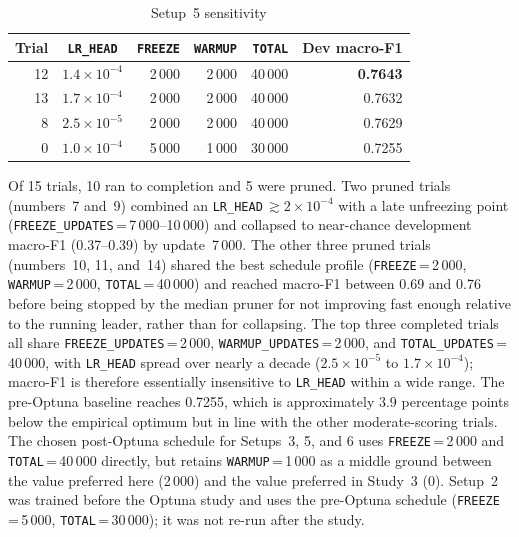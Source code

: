 \begin{table}[H]
\centering
\caption{Setup~5 sensitivity}
\label{tab:app:opt_hubert}
\small
\setlength{\tabcolsep}{5pt}
\begin{tabular}{@{}rcrrrr@{}}
\toprule
\textbf{Trial} & \textbf{\texttt{LR\_HEAD}} & \textbf{\texttt{FREEZE}} & \textbf{\texttt{WARMUP}} & \textbf{\texttt{TOTAL}} & \textbf{Dev macro-F1} \\
\midrule
12      & \(1.4{\times}10^{-4}\) & 2\,000 & 2\,000 & 40\,000 & \textbf{0.7643} \\
13            & \(1.7{\times}10^{-4}\) & 2\,000 & 2\,000 & 40\,000 & 0.7632 \\
 8            & \(2.5{\times}10^{-5}\) & 2\,000 & 2\,000 & 40\,000 & 0.7629 \\
\midrule
 0 & \(1.0{\times}10^{-4}\) & 5\,000 & 1\,000 & 30\,000 & 0.7255 \\
\bottomrule
\end{tabular}
\end{table}

Of 15 trials, 10 ran to completion and 5 were pruned. Two pruned trials
(numbers~7 and~9) combined an \texttt{LR\_HEAD}\,$\gtrsim 2{\times}10^{-4}$
with a late unfreezing point (\texttt{FREEZE\_UPDATES}\,=\,7\,000--10\,000) and
collapsed to near-chance development macro-F1 (0.37--0.39) by update~7\,000.
The other three pruned trials (numbers~10, 11, and~14) shared the best
schedule profile (\texttt{FREEZE}\,=\,2\,000, \texttt{WARMUP}\,=\,2\,000,
\texttt{TOTAL}\,=\,40\,000) and reached macro-F1 between 0.69 and 0.76 before
being stopped by the median pruner for not improving fast enough relative to
the running leader, rather than for collapsing. The top three completed trials
all share \texttt{FREEZE\_UPDATES}\,=\,2\,000, \texttt{WARMUP\_UPDATES}\,=\,2\,000,
and \texttt{TOTAL\_UPDATES}\,=\,40\,000, with \texttt{LR\_HEAD} spread over
nearly a decade ($2.5{\times}10^{-5}$ to $1.7{\times}10^{-4}$); macro-F1 is
therefore essentially insensitive to \texttt{LR\_HEAD} within a wide range.
The pre-Optuna baseline reaches 0.7255, which is approximately 3.9 percentage
points below the empirical optimum but in line with the other moderate-scoring
trials. The chosen post-Optuna schedule for Setups~3, 5, and 6 uses
\texttt{FREEZE}\,=\,2\,000 and \texttt{TOTAL}\,=\,40\,000 directly, but
retains \texttt{WARMUP}\,=\,1\,000 as a middle ground between the value
preferred here (2\,000) and the value preferred in Study~3 (0). Setup~2 was
trained before the Optuna study and uses the pre-Optuna schedule
(\texttt{FREEZE}\,=\,5\,000, \texttt{TOTAL}\,=\,30\,000); it was not re-run
after the study.

